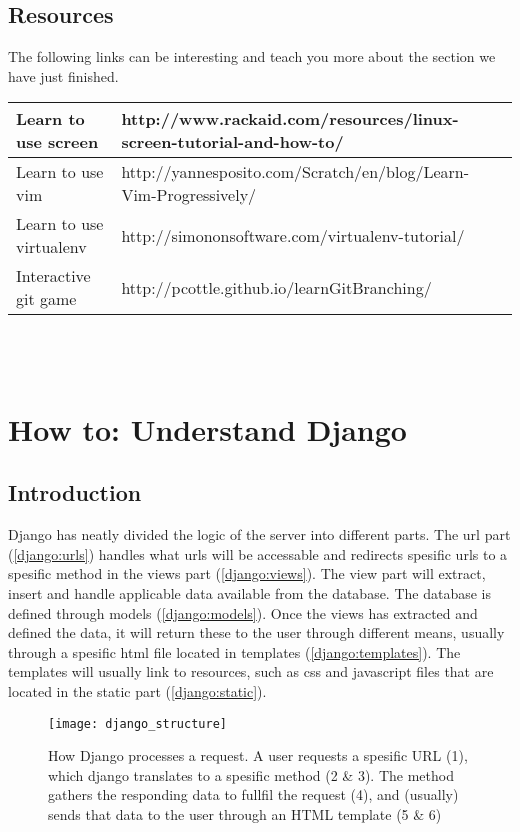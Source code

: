 \documentclass{report}
\begin{document}
\subsection{Resources}
The following links can be interesting and teach you more about the section we have just finished. \\

\begin{tabular}{| l | p{9cm} |} \hline
Learn to use screen & http://www.rackaid.com/resources/linux-screen-tutorial-and-how-to/ \\ \hline
Learn to use vim & http://yannesposito.com/Scratch/en/blog/Learn-Vim-Progressively/ \\ \hline
Learn to use virtualenv & http://simononsoftware.com/virtualenv-tutorial/ \\ \hline
Interactive git game & http://pcottle.github.io/learnGitBranching/ \\ \hline
\end{tabular}\\ \\

\section{How to: Understand Django} \label{sec:understand_django}
\subsection{Introduction}
Django has neatly divided the logic of the server into different parts. The url part (\ref{django:urls}) handles what urls will be accessable and redirects spesific urls to a spesific method in the views part (\ref{django:views}). The view part will extract, insert and handle applicable data available from the database. The database is defined through models (\ref{django:models}). Once the views has extracted and defined the data, it will return these to the user through different means, usually through a spesific html file located in templates (\ref{django:templates}). The templates will usually link to resources, such as css and javascript files that are located in the static part (\ref{django:static}). 

\begin{figure}
    \centering
    \texttt{[image: django\_structure]}
    \caption{How Django processes a request. A user requests a spesific URL (1), which django translates to a spesific method (2 \& 3). The method gathers the responding data to fullfil the request (4), and (usually) sends that data to the user through an HTML template (5 \& 6) \label{fig:django_struct}}
\end{figure}
\end{document}
